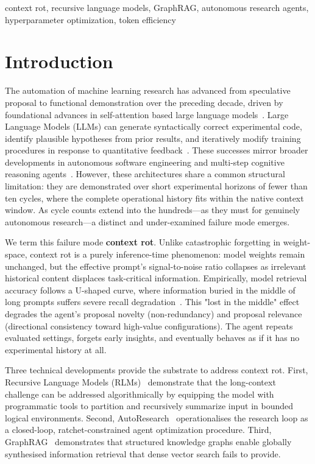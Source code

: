 \documentclass[conference]{IEEEtran}
\begin{document}
\begin{IEEEkeywords}
context rot, recursive language models, GraphRAG, autonomous research agents, hyperparameter optimization, token efficiency
\end{IEEEkeywords}

\section{Introduction}
\label{sec:intro}

The automation of machine learning research has advanced from speculative proposal to functional demonstration over the preceding decade, driven by foundational advances in self-attention based large language models~\citep{vaswani2017attention}. Large Language Models (LLMs) can generate syntactically correct experimental code, identify plausible hypotheses from prior results, and iteratively modify training procedures in response to quantitative feedback~\citep{karpathy2026,lu2024aiscientist}. These successes mirror broader developments in autonomous software engineering and multi-step cognitive reasoning agents~\citep{yang2024sweagent,jimenez2023swebench,yao2022react,weng2023agent}. However, these architectures share a common structural limitation: they are demonstrated over short experimental horizons of fewer than ten cycles, where the complete operational history fits within the native context window. As cycle counts extend into the hundreds---as they must for genuinely autonomous research---a distinct and under-examined failure mode emerges.

We term this failure mode \textbf{context rot}. Unlike catastrophic forgetting in weight-space, context rot is a purely inference-time phenomenon: model weights remain unchanged, but the effective prompt's signal-to-noise ratio collapses as irrelevant historical content displaces task-critical information. Empirically, model retrieval accuracy follows a U-shaped curve, where information buried in the middle of long prompts suffers severe recall degradation~\citep{liu2023lost}. This "lost in the middle" effect degrades the agent's proposal novelty (non-redundancy) and proposal relevance (directional consistency toward high-value configurations). The agent repeats evaluated settings, forgets early insights, and eventually behaves as if it has no experimental history at all.

Three technical developments provide the substrate to address context rot. First, Recursive Language Models (RLMs)~\citep{zhang2025rlm} demonstrate that the long-context challenge can be addressed algorithmically by equipping the model with programmatic tools to partition and recursively summarize input in bounded logical environments. Second, AutoResearch~\citep{karpathy2026} operationalises the research loop as a closed-loop, ratchet-constrained agent optimization procedure. Third, GraphRAG~\citep{edge2024graphrag} demonstrates that structured knowledge graphs enable globally synthesised information retrieval that dense vector search fails to provide.
\end{document}

